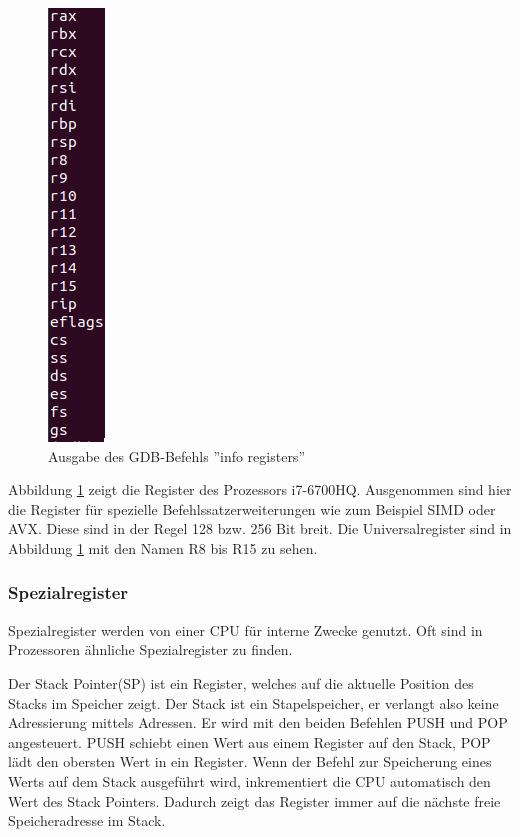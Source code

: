 \documentclass[a4paper,12pt]{article}
\begin{document}


\begin{figure}
\centering
\includegraphics[scale=0.5]{inforeg}
\centering
\caption{Ausgabe des GDB-Befehls ''info registers''}
\label{fig:inforeg}
\end{figure}

\noindent Abbildung \ref{fig:inforeg} zeigt die Register des Prozessors i7-6700HQ. Ausgenommen sind hier die Register für spezielle Befehlssatzerweiterungen wie zum Beispiel SIMD oder AVX. Diese sind in der Regel 128 bzw. 256 Bit breit. Die Universalregister sind in Abbildung \ref{fig:inforeg} mit den Namen R8 bis R15 zu sehen.
\subsubsection{Spezialregister}
Spezialregister werden von einer CPU für interne Zwecke genutzt. Oft sind in Prozessoren ähnliche Spezialregister zu finden. 

\par \bigskip
\noindent Der Stack Pointer(SP) ist ein Register, welches auf die aktuelle Position des Stacks im Speicher zeigt. Der Stack ist ein Stapelspeicher, er verlangt also keine Adressierung mittels Adressen. Er wird mit den beiden Befehlen PUSH und POP angesteuert. PUSH schiebt einen Wert aus einem Register auf den Stack, POP lädt den obersten Wert in ein Register.  Wenn der Befehl zur Speicherung eines Werts auf dem Stack ausgeführt wird, inkrementiert die CPU automatisch den Wert des Stack Pointers. Dadurch zeigt das Register immer auf die nächste freie Speicheradresse im Stack.
\end{document}
